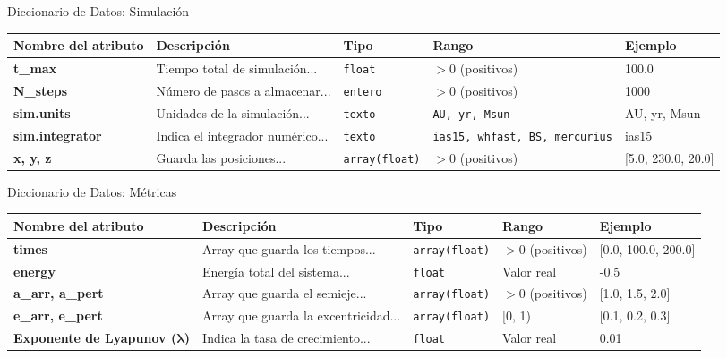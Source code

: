 \begin{frame}{Diccionario de Datos: Simulación}
  \centering
  \label{tab:diccionario_simulación_slide}
  \begin{adjustbox}{max width=0.9\textwidth}
    \begin{tabular}{@{}p{3cm} p{4cm} p{1.5cm} p{1.5cm} p{2.5cm}@{}}
      \toprule
      \textbf{Nombre del atributo} & \textbf{Descripción} & \textbf{Tipo} & \textbf{Rango} & \textbf{Ejemplo} \\
      \midrule
      \textbf{t\_max} & Tiempo total de simulación... & \texttt{float} & \( > 0 \) (positivos) & 100.0 \\
      \midrule
      \textbf{N\_steps} & Número de pasos a almacenar... & \texttt{entero} & \(>0\) (positivos) & 1000 \\
      \midrule
      \textbf{sim.units} & Unidades de la simulación... & \texttt{texto} & \texttt{AU, yr, Msun} & AU, yr, Msun \\
      \midrule
      \textbf{sim.integrator} & Indica el integrador numérico... & \texttt{texto} & \texttt{ias15, whfast, BS, mercurius} & ias15 \\
      \midrule
      \textbf{x, y, z} & Guarda las posiciones... & \texttt{array(float)} & \(>0\) (positivos) & [5.0, 230.0, 20.0] \\
      \bottomrule
    \end{tabular}
  \end{adjustbox}
\end{frame}

\begin{frame}{Diccionario de Datos: Métricas}
  \centering
  \label{tab:diccionario_métricas_slide}
  \begin{adjustbox}{max width=0.9\textwidth}
    \begin{tabular}{@{}p{3cm} p{4cm} p{2.5cm} p{1.5cm} p{2.5cm}@{}}
      \toprule
      \textbf{Nombre del atributo} & \textbf{Descripción} & \textbf{Tipo} & \textbf{Rango} & \textbf{Ejemplo} \\
      \midrule
      \textbf{times} & Array que guarda los tiempos... & \texttt{array(float)} & \(>0\) (positivos) & [0.0, 100.0, 200.0] \\
      \midrule
      \textbf{energy} & Energía total del sistema... & \texttt{float} & Valor real & -0.5 \\
      \midrule
      \textbf{a\_arr, a\_pert} & Array que guarda el semieje... & \texttt{array(float)} & \(>0\) (positivos) & [1.0, 1.5, 2.0] \\
      \midrule
      \textbf{e\_arr, e\_pert} & Array que guarda la excentricidad... & \texttt{array(float)} & [0, 1) & [0.1, 0.2, 0.3] \\
      \midrule
      \textbf{Exponente de Lyapunov ($\mathbf{\lambda}$)}& Indica la tasa de crecimiento... & \texttt{float} & Valor real & 0.01 \\
      \bottomrule
    \end{tabular}
  \end{adjustbox}
\end{frame}